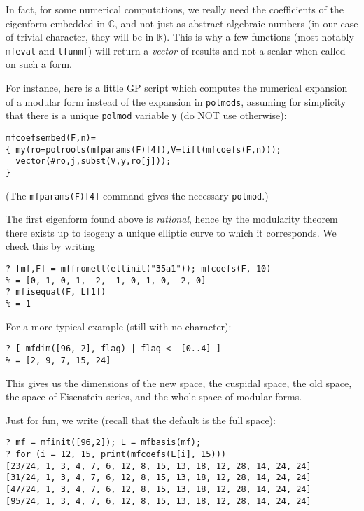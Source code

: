 \documentclass[11pt]{article}
\newcommand{\R}{{\mathbb R}}
\newcommand{\C}{{\mathbb C}}
\def\kbd#1{{\tt #1}}
\begin{document}
In fact, for some numerical computations, we really need the
coefficients of the eigenform embedded in $\C$, and not just as abstract
algebraic numbers (in our case of trivial character, they will be in $\R$).
This is why a few functions (most notably \kbd{mfeval} and \kbd{lfunmf})
will return a \emph{vector} of results and not a scalar when called on such
a form.

For instance, here is a little GP script which computes the
numerical expansion of a modular form instead of the expansion in
\kbd{polmods}, assuming for simplicity that there is a unique \kbd{polmod}
variable \kbd{y} (do NOT use otherwise):

\begin{verbatim}
mfcoefsembed(F,n)=
{ my(ro=polroots(mfparams(F)[4]),V=lift(mfcoefs(F,n)));
  vector(#ro,j,subst(V,y,ro[j]));
}
\end{verbatim}

(The \kbd{mfparams(F)[4]} command gives the necessary \kbd{polmod}.)

The first eigenform found above is \emph{rational}, hence by the modularity
theorem there exists up to isogeny a unique elliptic curve to which it
corresponds. We check this by writing

\begin{verbatim}
? [mf,F] = mffromell(ellinit("35a1")); mfcoefs(F, 10)
% = [0, 1, 0, 1, -2, -1, 0, 1, 0, -2, 0]
? mfisequal(F, L[1])
% = 1
\end{verbatim}

For a more typical example (still with no character):

\begin{verbatim}
? [ mfdim([96, 2], flag) | flag <- [0..4] ]
% = [2, 9, 7, 15, 24]
\end{verbatim}

This gives us the dimensions of the new space, the cuspidal space,
the old space, the space of Eisenstein series, and the whole space of
modular forms.

Just for fun, we write (recall that the default is the full space):

\begin{verbatim}
? mf = mfinit([96,2]); L = mfbasis(mf);
? for (i = 12, 15, print(mfcoefs(L[i], 15)))
[23/24, 1, 3, 4, 7, 6, 12, 8, 15, 13, 18, 12, 28, 14, 24, 24]
[31/24, 1, 3, 4, 7, 6, 12, 8, 15, 13, 18, 12, 28, 14, 24, 24]
[47/24, 1, 3, 4, 7, 6, 12, 8, 15, 13, 18, 12, 28, 14, 24, 24]
[95/24, 1, 3, 4, 7, 6, 12, 8, 15, 13, 18, 12, 28, 14, 24, 24]
\end{verbatim}
\end{document}
